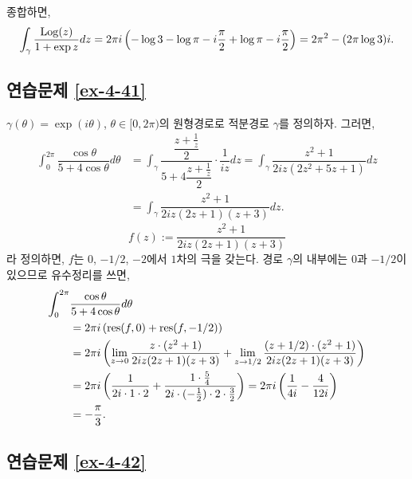 종합하면,
\[
\int_\gamma \displaystyle\frac{\mathop{\mathrm{Log}}(z)}{1+\exp z} dz
= 2\pi i \left( -\log 3 - \log \pi - i\displaystyle\frac\pi2 + \log \pi - i\displaystyle\frac\pi 2\right)
= 2\pi^2 - (2\pi \log 3)i.
\]

\subsection*{연습문제 \ref{ex-4-41}}

$\gamma(\theta)  = \exp(i\theta)$, $\theta\in [0,2\pi)$의
원형경로로 적분경로 $\gamma$를 정의하자.
그러면,
\begin{align*}
\int_0^{2\pi} \dfrac{\cos\theta}{5+4\cos\theta} d\theta
&= \int_\gamma \dfrac{\dfrac{z+\frac1z}2}{5+4\dfrac{z+\frac1z}2}\cdot \dfrac1{iz}dz
= \int_\gamma \dfrac{z^2+1}{2iz(2z^2+5z+1)}dz \\
&= \int_\gamma \dfrac{z^2+1}{2iz(2z+1)(z+3)}dz.
\end{align*}
\[
f(z):= \dfrac{z^2+1}{2iz(2z+1)(z+3)}
\]
라 정의하면, $f$는 $0$, $-1/2$, $-2$에서 $1$차의 극을 갖는다.
경로 $\gamma$의 내부에는 $0$과 $-1/2$이 있으므로
유수정리를 쓰면,
\begin{align*}
\int_0^{2\pi} & \displaystyle\frac{\cos\theta}{5+4\cos\theta} d\theta \\
&=2\pi i \left(\mathop{\mathrm{res}}(f,0) + \mathop{\mathrm{res}}(f,-1/2)\right) \\
&=2\pi i \left(\lim_{z\to0} \displaystyle\frac{z\cdot(z^2+1)}{2iz(2z+1)(z+3)}
+ \lim_{z\to1/2} \displaystyle\frac{(z+1/2)\cdot(z^2+1)}{2iz(2z+1)(z+3)} \right) \\
&= 2\pi i \left( \displaystyle\frac1{2i\cdot 1\cdot 2} 
+ \displaystyle\frac{1\cdot\frac54}{2i\cdot (-\frac12)\cdot2\cdot\frac32} \right)
= 2\pi i \left( \displaystyle\frac1{4i} - \displaystyle\frac4{12i} \right) \\
&= -\displaystyle\frac\pi3.
\end{align*}

\subsection*{연습문제 \ref{ex-4-42}}

